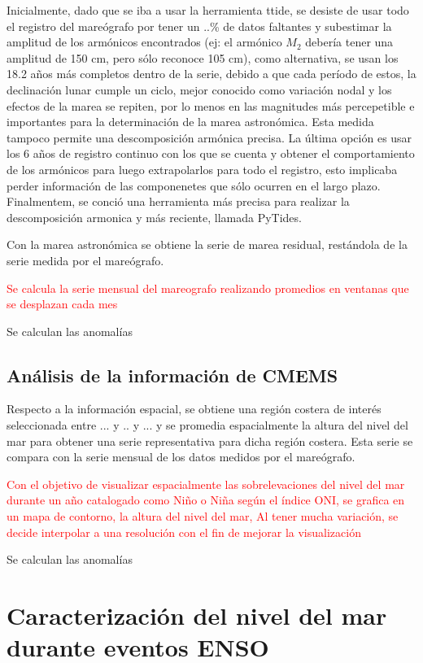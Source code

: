 Inicialmente, dado que se iba a usar la herramienta ttide, se desiste de usar todo el registro del mareógrafo por tener un ..\% de datos faltantes y subestimar la amplitud de los armónicos encontrados (ej: el armónico $M_{2}$ debería tener una amplitud de 150 cm, pero sólo reconoce 105 cm), como alternativa, se usan los 18.2 años más completos dentro de la serie, debido a que cada período de estos, la declinación lunar cumple un ciclo, mejor conocido como variación nodal y los efectos de la marea se repiten, por lo menos en las magnitudes más percepetible e importantes para la determinación de la marea astronómica. Esta medida tampoco permite una descomposición armónica precisa. La última opción es usar los 6 años de registro continuo con los que se cuenta y obtener el comportamiento de los armónicos para luego extrapolarlos para todo el registro, esto implicaba perder información de las componenetes que sólo ocurren en el largo plazo. Finalmentem, se conció una herramienta más precisa para realizar la descomposición armonica y más reciente, llamada PyTides.

Con la marea astronómica se obtiene la serie de marea residual, restándola de la serie medida por el mareógrafo.

\textcolor{red}{Se calcula la serie mensual del mareografo realizando promedios en ventanas que se desplazan cada mes}

Se calculan las anomalías

\subsection{Análisis de la información de CMEMS}
Respecto a la información espacial, se obtiene una región costera de interés seleccionada entre ... y .. y ... y se promedia espacialmente la altura del nivel del mar para obtener una serie representativa para dicha región costera. Esta serie se compara con la serie mensual de los datos medidos por el mareógrafo.

\textcolor{red}{Con el objetivo de visualizar espacialmente las sobrelevaciones del nivel del mar durante un año catalogado como Niño o Niña según el índice ONI, se grafica en un mapa de contorno, la altura del nivel del mar, Al tener mucha variación, se decide interpolar a una resolución con el fin de mejorar la visualización}

Se calculan las anomalías

\section{Caracterización del nivel del mar durante eventos ENSO}

